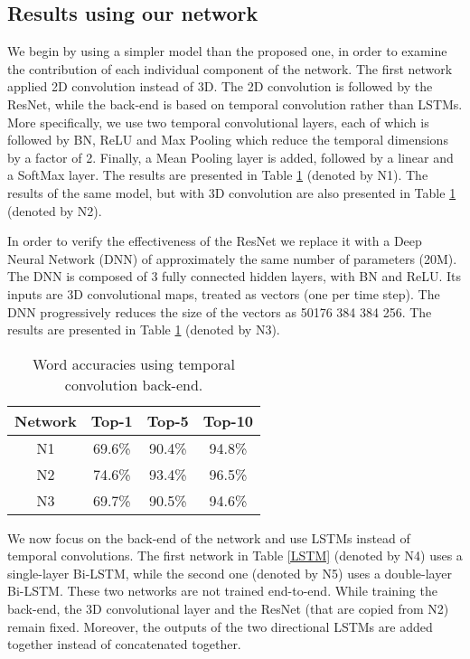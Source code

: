 \documentclass[a4paper]{article}
\begin{document}
\subsection{Results using our network}
We begin by using a simpler model than the proposed one, in order to examine the contribution of each individual component of the network. The first network applied 2D convolution instead of 3D. The 2D convolution is followed by the ResNet, while the back-end is based on temporal convolution rather than LSTMs. More specifically, we use two temporal convolutional layers, each of which is followed by BN, ReLU and Max Pooling which reduce the temporal dimensions by a factor of 2. Finally, a Mean Pooling layer is added, followed by a linear and a SoftMax layer. The results are presented in Table \ref{Temporal} (denoted by N1). The results of the same model, but with 3D convolution are also presented in Table \ref{Temporal} (denoted by N2). 

In order to verify the effectiveness of the ResNet we replace it with a Deep Neural Network (DNN) of approximately the same number of parameters (20M). The DNN is composed of 3 fully connected hidden layers, with BN and ReLU. Its inputs are 3D convolutional maps, treated as vectors (one per time step). The DNN progressively reduces the size of the vectors as 50176  384  384  256. The results are presented in Table \ref{Temporal} (denoted by N3).  

\begin{table}[!htbp]
\centering
\begin{tabular}{| c || c | c | c|} 
\hline
Network & Top-1 & Top-5 & Top-10 \\ [0.5ex] 
\hline
N1 & 69.6\% & 90.4\% & 94.8\% \\ 
\hline
N2 & 74.6\% & 93.4\% & 96.5\% \\ 
\hline
N3 & 69.7\% & 90.5\% & 94.6\% \\ 
\hline
\end{tabular}
\vspace{1mm}\caption{Word accuracies using temporal convolution back-end.}\label{Temporal}
\end{table}

We now focus on the back-end of the network and use LSTMs instead of temporal convolutions. The first network in Table \ref{LSTM} (denoted by N4) uses a single-layer Bi-LSTM, while the second one (denoted by N5) uses a double-layer Bi-LSTM. These two networks are not trained end-to-end. While training the back-end, the 3D convolutional layer and the ResNet (that are copied from N2) remain fixed. Moreover, the outputs of the two directional LSTMs are added together instead of concatenated together.  
\end{document}
